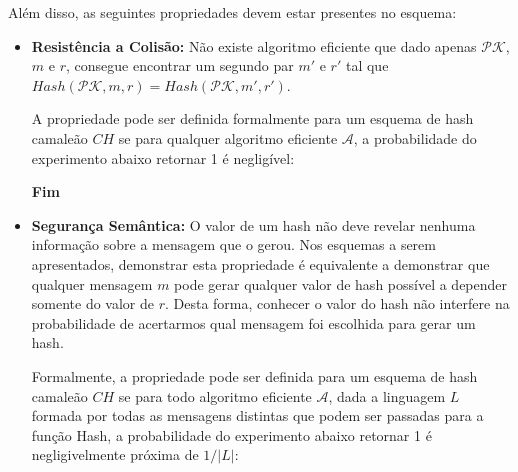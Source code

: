 \documentclass[a4paper]{article}
\begin{document}
Além disso, as seguintes propriedades devem estar presentes no
esquema:

\begin{itemize}
\item\textbf{Resistência a Colisão: }Não existe algoritmo eficiente
  que dado apenas $\mathcal{PK}$, $m$ e $r$, consegue encontrar um
  segundo par $m'$ e $r'$ tal que $Hash(\mathcal{PK}, m, r) =
  Hash(\mathcal{PK}, m', r')$.

  A propriedade pode ser definida formalmente para um esquema de hash
  camaleão $CH$ se para qualquer algoritmo eficiente $\mathcal{A}$, a
  probabilidade do experimento abaixo retornar 1 é negligível:

  \noindent
  \begin{algorithm}[H]
    \SetAlgoLined
     \textbf{Fim}
  \end{algorithm}
  
\item\textbf{Segurança Semântica: }O valor de um hash não deve
  revelar nenhuma informação sobre a mensagem que o gerou. Nos
  esquemas a serem apresentados, demonstrar esta propriedade é
  equivalente a demonstrar que qualquer mensagem $m$ pode gerar
  qualquer valor de hash possível a depender somente do valor de
  $r$. Desta forma, conhecer o valor do hash não interfere na
  probabilidade de acertarmos qual mensagem foi escolhida para gerar
  um hash.

  Formalmente, a propriedade pode ser definida para um esquema de hash
  camaleão $CH$ se para todo algoritmo eficiente $\mathcal{A}$, dada a
  linguagem $L$ formada por todas as mensagens distintas que podem ser
  passadas para a função Hash, a probabilidade do experimento abaixo
  retornar 1 é negligivelmente próxima de $1/|L|$:

  \noindent
  \begin{algorithm}[H]
    \SetAlgoLined
     
  \end{algorithm}


\end{itemize}
\end{document}
